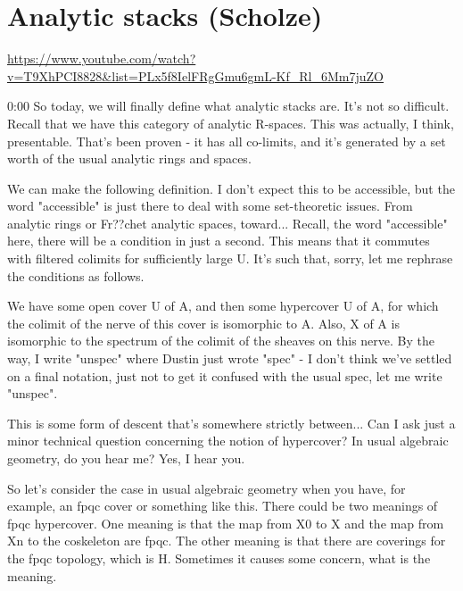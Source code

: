 
\section{\ufs Analytic stacks (Scholze)}

\url{https://www.youtube.com/watch?v=T9XhPCI8828&list=PLx5f8IelFRgGmu6gmL-Kf_Rl_6Mm7juZO}
\renewcommand{\yt}[2]{\href{https://www.youtube.com/watch?v=T9XhPCI8828&list=PLx5f8IelFRgGmu6gmL-Kf_Rl_6Mm7juZO&t=#1}{#2}}
\vspace{1em}

\begin{unfinished}{0:00}
So today, we will finally define what analytic stacks are. It's not so difficult. Recall that we have this category of analytic R-spaces. This was actually, I think, presentable. That's been proven - it has all co-limits, and it's generated by a set worth of the usual analytic rings and spaces.

We can make the following definition. I don't expect this to be accessible, but the word "accessible" is just there to deal with some set-theoretic issues. From analytic rings or Fr??chet analytic spaces, toward... Recall, the word "accessible" here, there will be a condition in just a second. This means that it commutes with filtered colimits for sufficiently large U. It's such that, sorry, let me rephrase the conditions as follows.

We have some open cover U of A, and then some hypercover U of A, for which the colimit of the nerve of this cover is isomorphic to A. Also, X of A is isomorphic to the spectrum of the colimit of the sheaves on this nerve. By the way, I write "unspec" where Dustin just wrote "spec" - I don't think we've settled on a final notation, just not to get it confused with the usual spec, let me write "unspec".

This is some form of descent that's somewhere strictly between... Can I ask just a minor technical question concerning the notion of hypercover? In usual algebraic geometry, do you hear me? Yes, I hear you.

So let's consider the case in usual algebraic geometry when you have, for example, an fpqc cover or something like this. There could be two meanings of fpqc hypercover. One meaning is that the map from X0 to X and the map from Xn to the coskeleton are fpqc. The other meaning is that there are coverings for the fpqc topology, which is H. Sometimes it causes some concern, what is the meaning. 


\end{unfinished}
